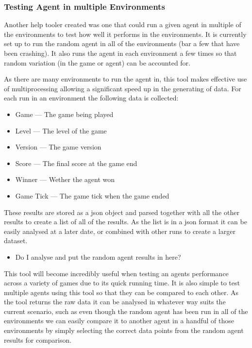 \documentclass[a4paper]{article}
\begin{document}
\subsubsection{Testing Agent in multiple Environments}
Another help tooler created was one that could run a given agent in multiple of the environments to test how well it performs in the environments.
It is currently set up to run the random agent in all of the environments (bar a few that have been crashing).
It also runs the agent in each environment a few times so that random variation (in the game or agent) can be accounted for.
\par
As there are many environments to run the agent in, this tool makes effective use of multiprocessing allowing a significant speed up in the generating of data.
For each run in an environment the following data is collected:
\begin{multicols}{2}
    \begin{itemize}[noitemsep,nolistsep]
        \item Game --- The game being played
        \item Level --- The level of the game
        \item Version --- The game version
        \item Score --- The final score at the game end
        \item Winner --- Wether the agent won
        \item Game Tick --- The game tick when the game ended
    \end{itemize}
\end{multicols}
These results are stored as a json object and parsed together with all the other results to create a list of all of the results.
As the list is in a json format it can be easily analysed at a later date, or combined with other runs to create a larger dataset.
\par
\begin{itemize}
    \item Do I analyse and put the random agent results in here?
\end{itemize}
\par
This tool will become incredibly useful when testing an agents performance across a variety of games due to its quick running time.
It is also simple to test multiple agents using this tool so that they can be compared to each other.
As the tool returns the raw data it can be analysed in whatever way suits the current scenario, such as even though the random agent has been run in all of the environments we can easily compare it to another agent in a handful of those environments by simply selecting the correct data points from the random agent results for comparison.
\end{document}
